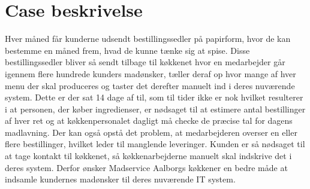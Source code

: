 \section{Case beskrivelse}
Hver måned får kunderne udsendt bestillingssedler på papirform, hvor de kan bestemme en måned frem, hvad de kunne tænke sig at spise.
Disse bestillingssedler bliver så sendt tilbage til køkkenet hvor en medarbejder går igennem flere hundrede kunders madønsker, tæller deraf op hvor mange af hver menu der skal produceres og taster det derefter manuelt ind i deres nuværende system.
Dette er der sat 14 dage af til, som til tider ikke er nok hvilket resulterer i at personen, der køber ingredienser, er nødsaget til at estimere antal bestillinger af hver ret og at køkkenpersonalet dagligt må checke de præcise tal for dagens madlavning.
Der kan også opstå det problem, at medarbejderen overser en eller flere bestillinger, hvilket leder til manglende leveringer.
Kunden er så nødsaget til at tage kontakt til køkkenet, så køkkenarbejderne manuelt skal indskrive det i deres system.
Derfor ønsker Madservice Aalborgs køkkener en bedre måde at indsamle kundernes madønsker til deres nuværende IT system.